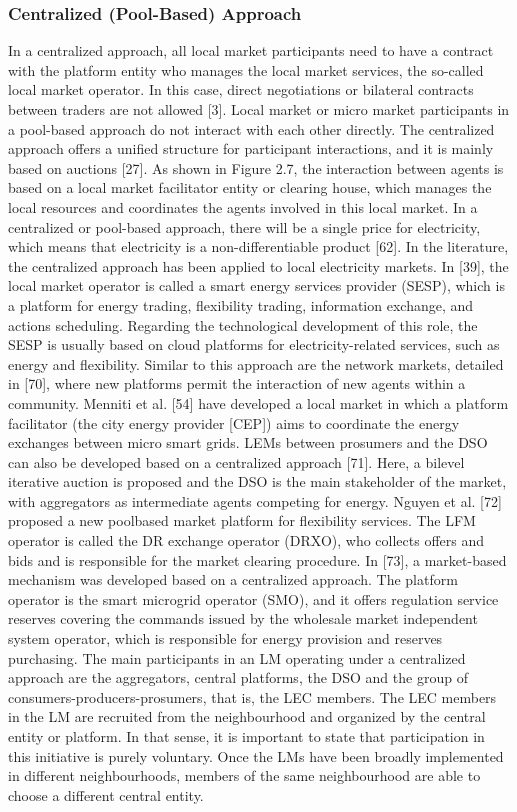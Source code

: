 \subsubsection{Centralized (Pool-Based) Approach}
In a centralized approach, all local market participants need to have a contract with the platform entity who manages the local market services, the so-called local market operator. In this case, direct negotiations or bilateral contracts between traders are not allowed [3]. Local market or micro market participants in a pool-based approach do not interact with each other directly. The centralized approach offers a unified structure for participant interactions, and it is mainly based on auctions [27]. As shown in Figure 2.7, the interaction between agents is based on a local market facilitator entity or clearing house, which manages the local resources and coordinates the agents involved in this local market. In a centralized or pool-based approach, there will be a single price for electricity, which means that electricity is a non-differentiable product [62]. In the literature, the centralized approach has been applied to local electricity markets. In [39], the local market operator is called a smart energy services provider (SESP), which is a platform for energy trading, flexibility trading, information exchange, and actions scheduling. Regarding the technological development of this role, the SESP is usually based on cloud platforms for electricity-related services, such as energy and flexibility. Similar to this approach are the network markets, detailed in [70], where new platforms permit the interaction of new agents within a community. Menniti et al. [54] have developed a local market in which a platform facilitator (the city energy provider [CEP]) aims to coordinate the energy exchanges between micro smart grids. LEMs between prosumers and the DSO can also be developed based on a centralized approach [71]. Here, a bilevel iterative auction is proposed and the DSO is the main stakeholder of the market, with aggregators as intermediate agents competing for energy. Nguyen et al. [72] proposed a new poolbased market platform for flexibility services. The LFM operator is called the DR exchange operator (DRXO), who collects offers and bids and is responsible for the market clearing procedure. In [73], a market-based mechanism was developed based on a centralized approach. The platform operator is the smart microgrid operator (SMO), and it offers regulation service reserves covering the commands issued by the wholesale market independent system operator, which is responsible for energy provision and reserves purchasing. The main participants in an LM operating under a centralized approach are the aggregators, central platforms, the DSO and the group of consumers-producers-prosumers, that is, the LEC members. The LEC members in the LM are recruited from the neighbourhood and organized by the central entity or platform. In that sense, it is important to state that participation in this initiative is purely voluntary. Once the LMs have been broadly implemented in different neighbourhoods, members of the same neighbourhood are able to
choose a different central entity.

